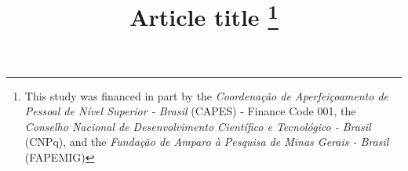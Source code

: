 
%
\RequirePackage{fix-cm}

\documentclass{svjour3}                      %


\smartqed  %

\usepackage{amssymb}
\usepackage{amsmath}
\usepackage[hmargin=3.4cm,vmargin=3cm]{geometry}
\usepackage{graphicx}
\usepackage[retainorgcmds]{IEEEtrantools}
\usepackage{hyperref}
\usepackage{rotating}
\usepackage{booktabs}
\usepackage{siunitx}
\usepackage{pdflscape}
\let\labelindent\relax
\usepackage{enumitem}
\usepackage{multirow}
\usepackage[normalem]{ulem}
\useunder{\uline}{\ul}{}
\usepackage{setspace} %
\usepackage[utf8]{inputenc}
\usepackage[linesnumbered, ruled, vlined]{algorithm2e}
\usepackage{rotating}
%

\usepackage{tkz-graph}

\usepackage{verbatim}
\usetikzlibrary{arrows,arrows.meta,shapes,decorations.pathmorphing, decorations.markings}



\title{Article title \thanks{This study was financed in part by the \emph{Coordenação de Aperfeiçoamento de Pessoal de Nível Superior - Brasil} (CAPES) - Finance Code 001, the \emph{Conselho Nacional de Desenvolvimento Científico e Tecnológico - Brasil} (CNPq), and the \emph{Fundação de Amparo à Pesquisa de Minas Gerais - Brasil} (FAPEMIG)}}.
}


